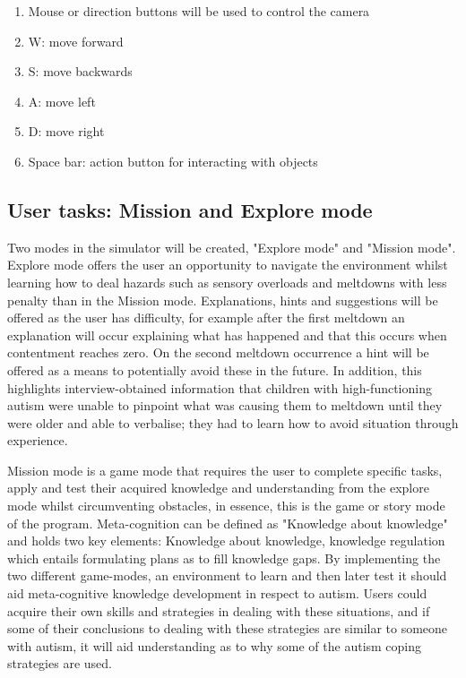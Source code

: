 \documentclass[11pt]{report}
\begin{document}
\begin{enumerate}
\item Mouse or direction buttons will be used to control the camera
\item W: move forward
\item S: move backwards
\item A: move left
\item D: move right
\item Space bar: action button for interacting with objects
\end{enumerate}

\subsection{User tasks: Mission and Explore mode}
Two modes in the simulator will be created, "Explore mode" and "Mission mode". Explore mode offers the user an opportunity to navigate the environment whilst learning how to deal hazards such as sensory overloads and meltdowns with less penalty than in the Mission mode. Explanations, hints and suggestions will be offered as the user has difficulty, for example after the first meltdown an explanation will occur explaining what has happened and that this occurs when contentment reaches zero. On the second meltdown occurrence a hint will be offered as a means to potentially avoid these in the future. In addition, this highlights interview-obtained information that children with high-functioning autism were unable to pinpoint what was causing them to meltdown until they were older and able to verbalise; they had to learn how to avoid situation through experience. 

Mission mode is a game mode that requires the user to complete specific tasks, apply and test their acquired knowledge and understanding from the explore mode whilst circumventing obstacles, in essence, this is the game or story mode of the program. Meta-cognition can be defined as "Knowledge about knowledge" and holds two key elements: Knowledge about knowledge, knowledge regulation which entails formulating plans as to fill knowledge gaps. By implementing the two different game-modes, an environment to learn and then later test it should aid meta-cognitive knowledge development in respect to autism. Users could acquire their own skills and strategies in dealing with these situations, and if some of their conclusions to dealing with these strategies are similar to someone with autism, it will aid understanding as to why some of the autism coping strategies are used.  
\end{document}
